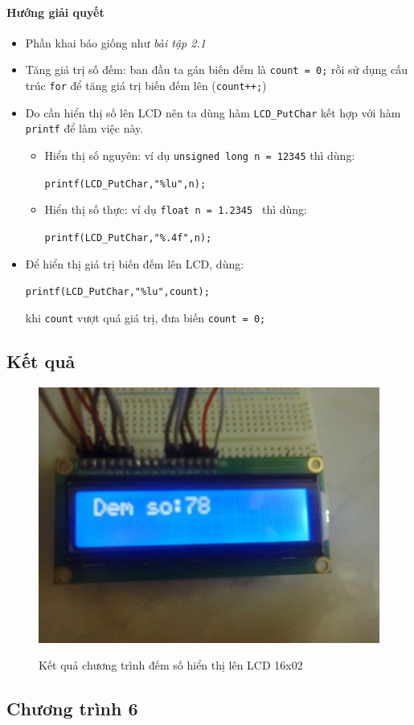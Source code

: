 \paragraph{Hướng giải quyết}
\begin{itemize}
\item Phần khai báo giống như \emph{bài tập 2.1}
\item Tăng giá trị số đếm: ban đầu ta gán biến đếm là \verb|count = 0;| rồi sử dụng cấu trúc \verb|for| để tăng giá trị biến đếm lên (\verb|count++;|)
\item Do cần hiển thị số lên LCD nên ta dùng hàm \verb|LCD_PutChar| kết hợp với hàm \verb|printf| để làm việc này.
\begin{itemize}
\item Hiển thị số nguyên: ví dụ \verb|unsigned long n = 12345| thì dùng:

\verb|printf(LCD_PutChar,"%lu",n);|
\item Hiển thị số thực: ví dụ \verb|float n = 1.2345 | thì dùng:

\verb|printf(LCD_PutChar,"%.4f",n);|
\end{itemize}
\item Để hiển thị giá trị biến đếm lên LCD, dùng:

\verb|printf(LCD_PutChar,"%lu",count);|

khi \verb|count| vượt quá giá trị, đưa biến \verb|count = 0;|
\end{itemize}
\subsection*{Kết quả}
\begin{figure}[!h]
\begin{center}
  {\includegraphics[width=.3\linewidth]{bai-2/image/2-3}}
\end{center}
\caption[]{Kết quả chương trình đếm số hiển thị lên LCD 16x02}
\end{figure}
\subsection*{Chương trình 6}

